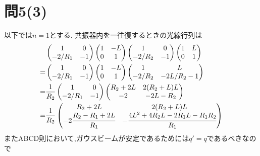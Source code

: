 \documentclass[uplatex,a4j,11pt,dvipdfmx]{jsarticle}
\begin{document}
\section*{問5(3)}
以下では$n=1$とする.
共振器内を一往復するときの光線行列は
\begin{align}
  \begin{split}
    &\begin{pmatrix}
      1&0\\
      -2/R_1&-1
    \end{pmatrix}
    \begin{pmatrix}
      1&-L\\
      0&1
    \end{pmatrix}
    \begin{pmatrix}
      1&0\\
      -2/R_2&-1
    \end{pmatrix}
    \begin{pmatrix}
      1&L\\
      0&1
    \end{pmatrix}\\
    =&\begin{pmatrix}
      1&0\\
      -2/R_1&-1
    \end{pmatrix}
    \begin{pmatrix}
      1&-L\\
      0&1
    \end{pmatrix}
    \begin{pmatrix}
      1&L\\
      -2/R_2&-2L/R_2-1
    \end{pmatrix}\\
    =&\frac{1}{R_2}\begin{pmatrix}
      1&0\\
      -2/R_1&-1
    \end{pmatrix}
    \begin{pmatrix}
      R_2+2L&2(R_2+L)L\\
      -2&-2L-R_2
    \end{pmatrix}\\
    =&\frac{1}{R_2}\begin{pmatrix}
      R_2+2L&2(R_2+L)L\\
      -2\cfrac{R_2-R_1+2L}{R_1}&-\cfrac{4L^2+4R_2L-2R_1L-R_1R_2}{R_1}
    \end{pmatrix}
  \end{split}
\end{align}
またABCD則において,ガウスビームが安定であるためには$q'=q$であるべきなので
\end{document}
